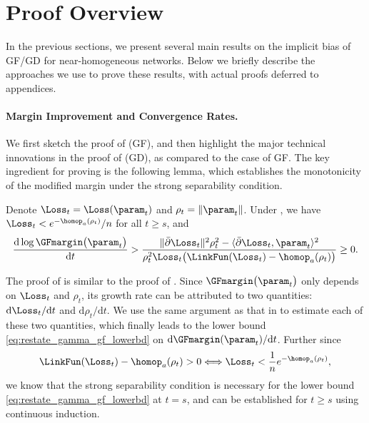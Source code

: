 \section{Proof Overview}\label{sec:proof_overview}
In the previous sections, we present several main results on the implicit bias of GF/GD for near-homogeneous networks. Below we briefly describe the approaches we use to prove these results, with actual proofs deferred to appendices.

\paragraph{Margin Improvement and Convergence Rates.}
We first sketch the proof of  (GF), and then highlight the major technical innovations in the proof of  (GD), as compared to the case of GF. The key ingredient for proving  is the following lemma, which establishes the monotonicity of the modified margin under the strong separability condition.

\begin{lemma}\label{lem:restate_gamma_gf_increase}
    Denote $\Loss_t = \Loss (\param_t)$ and $\rho_t = \| \param_t \|$. Under , we have  
    $\Loss_t < e^{-\homop_a(\rho_t)}/n$ for all $t\ge s$, and
    \begin{equation}\label{eq:restate_gamma_gf_lowerbd}
        \frac{\mathrm{d} \log \GFmargin \big(\param_t\big)}{\mathrm{d} t} > \frac{\| \bar \partial \Loss_t \|^2 \rho_t^2 - \langle  \bar \partial \Loss_t , \param_t \rangle^2  }{\rho_t^2\Loss_t \big (\LinkFun(\Loss_t) - \homop_a(\rho_t)\big)} \ge 0.
    \end{equation}
\end{lemma}

The proof of  is similar to the proof of \citet[Lemma 5.1]{lyu2020gradient}. Since $\GFmargin \big(\param_t\big)$ only depends on $\Loss_t$ and $\rho_t$, its growth rate can be attributed to two quantities: $\mathrm{d} \Loss_t / \mathrm{d} t$ and $\mathrm{d} \rho_t / \mathrm{d} t$. We use the same argument as that in \citet[Proof sketch of Lemma 5.1]{lyu2020gradient} to estimate each of these two quantities, which finally leads to the lower bound \eqref{eq:restate_gamma_gf_lowerbd} on $\mathrm{d} \GFmargin ( \param_t ) / \mathrm{d} t$. Further since
\begin{equation*}
    \LinkFun(\Loss_t) - \homop_a(\rho_t) > 0 \Longleftrightarrow \Loss_t < \frac{1}{n} e^{- \homop_a (\rho_t)},
\end{equation*}
we know that the strong separability condition is necessary for the lower bound \eqref{eq:restate_gamma_gf_lowerbd} at $t = s$, and can be established for $t \ge s$ using continuous induction.

